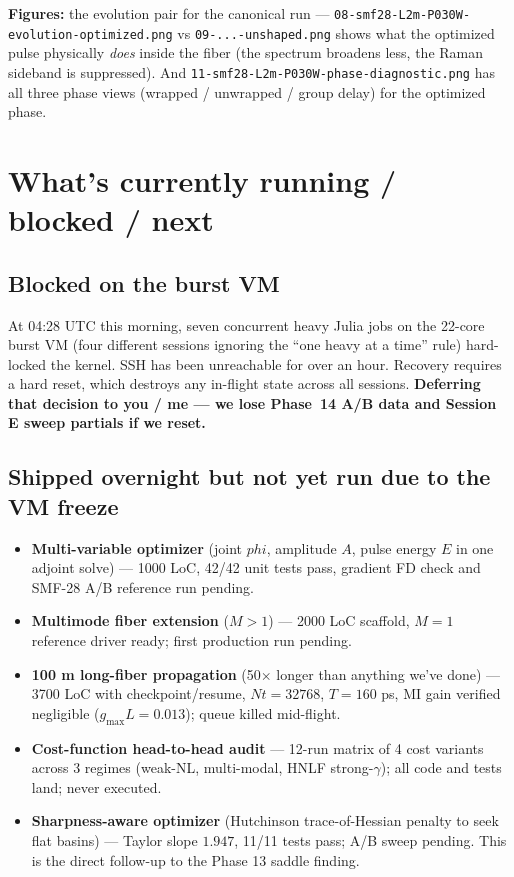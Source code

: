 \documentclass[11pt,letterpaper]{article}
\def\varphi{phi}\def\lambda{lambda}\def\mathrm#1{#1}%
\begin{document}
\textbf{Figures:} the evolution pair for the canonical run --- \texttt{08-smf28-L2m-P030W-evolution-optimized.png} vs \texttt{09-...-unshaped.png} shows what the optimized pulse physically \emph{does} inside the fiber (the spectrum broadens less, the Raman sideband is suppressed). And \texttt{11-smf28-L2m-P030W-phase-diagnostic.png} has all three phase views (wrapped / unwrapped / group delay) for the optimized phase.

\section{What's currently running / blocked / next}

\subsection*{Blocked on the burst VM}
At 04:28 UTC this morning, seven concurrent heavy Julia jobs on the 22-core burst VM (four different sessions ignoring the ``one heavy at a time'' rule) hard-locked the kernel. SSH has been unreachable for over an hour. Recovery requires a hard reset, which destroys any in-flight state across all sessions. \textbf{Deferring that decision to you / me --- we lose Phase~14 A/B data and Session E sweep partials if we reset.}

\subsection*{Shipped overnight but not yet run due to the VM freeze}
\begin{itemize}[leftmargin=*]
  \item \textbf{Multi-variable optimizer} (joint $\varphi$, amplitude $A$, pulse energy $E$ in one adjoint solve) --- 1000 LoC, 42/42 unit tests pass, gradient FD check and SMF-28 A/B reference run pending.
  \item \textbf{Multimode fiber extension} ($M > 1$) --- 2000 LoC scaffold, $M=1$ reference driver ready; first production run pending.
  \item \textbf{100 m long-fiber propagation} (50$\times$ longer than anything we've done) --- 3700 LoC with checkpoint/resume, $\mathrm{Nt}=32768$, $T=160$ ps, MI gain verified negligible ($g_{\max} L = 0.013$); queue killed mid-flight.
  \item \textbf{Cost-function head-to-head audit} --- 12-run matrix of 4 cost variants across 3 regimes (weak-NL, multi-modal, HNLF strong-$\gamma$); all code and tests land; never executed.
  \item \textbf{Sharpness-aware optimizer} (Hutchinson trace-of-Hessian penalty to seek flat basins) --- Taylor slope $1.947$, 11/11 tests pass; A/B sweep pending. This is the direct follow-up to the Phase 13 saddle finding.
\end{itemize}
\end{document}
